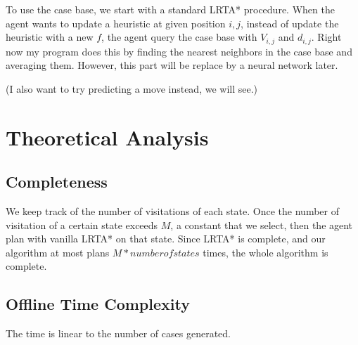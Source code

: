 \documentclass[letterpaper]{article}
\newcommand{\citea}[1]{\citeauthor{#1} (\citeyear{#1})}
\numberwithin{equation}{section}
\numberwithin{theorem}{section}
\numberwithin{lemma}{section}
\numberwithin{df}{section}
\begin{document}
    To use the case base, we start with a standard LRTA* procedure.
    When the agent wants to update a heuristic at given position $i, j$, instead of update the heuristic with a new $f$, the agent query the case base with $V_{i, j}$ and $d_{i, j}$.
    Right now my program does this by finding the nearest neighbors in the case base and averaging them.
    However, this part will be replace by a neural network later.

    (I also want to try predicting a move instead, we will see.)




    \section{Theoretical Analysis}\label{sec:theoretical-analysis}


    \subsection{Completeness}\label{subsec:completeness}
    We keep track of the number of visitations of each state.
    Once the number of visitation of a certain state exceeds $M$, a constant that we select, then the agent plan with vanilla LRTA* on that state.
    Since LRTA* is complete, and our algorithm at most plans $M * number of states$ times, the whole algorithm is complete.

    \subsection{Offline Time Complexity}\label{subsec:offline-time-complexity}
    The time is linear to the number of cases generated.
\end{document}

